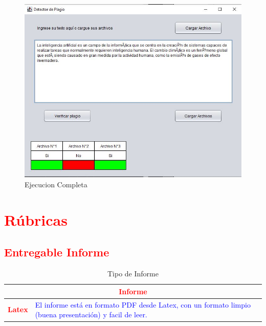 \documentclass{article}
\begin{document}
	\begin{figure}[H]
		\centering
		\caption{Ejecucion Completa}
		\includegraphics[width=1\textwidth,keepaspectratio]{img/EjecucionCompleta.jpg}
	\end{figure}
		
	\section{\textcolor{red}{Rúbricas}}
	
	\subsection{\textcolor{red}{Entregable Informe}}
	\begin{table}[H]
		\caption{Tipo de Informe}
		\setlength{\tabcolsep}{0.5em} %
		{\renewcommand{\arraystretch}{1.5}%
		\begin{tabular}{|p{3cm}|p{12cm}|}
			\hline
			\multicolumn{2}{|c|}{\textbf{\textcolor{red}{Informe}}}  \\
			\hline 
			\textbf{\textcolor{red}{Latex}} & \textcolor{blue}{El informe está en formato PDF desde Latex,  con un formato limpio (buena presentación) y facil de leer.}   \\ 
			\hline 
			
			
		\end{tabular}
	}
	\end{table}
	
\end{document}
